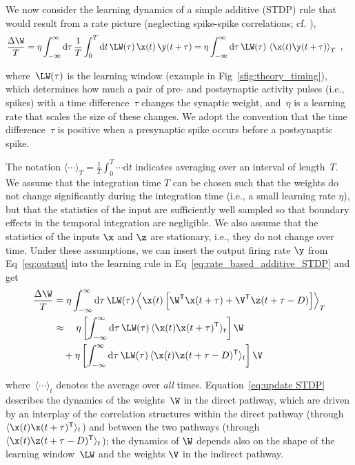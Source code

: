 We now consider the learning dynamics of a simple additive  (STDP) rule that would result from a rate picture (neglecting spike-spike correlations; cf. \cite{Kempter1999}),
\begin{align}
\frac{\Delta \W}{T} & =
\eta \int_{-\infty}^{\infty} \mathrm{d} \tau \, \frac{1}{T} \int_0^T \mathrm{d}t \, \LW(\tau)\, \x(t) \,\y(t+\tau)
= \eta \int_{-\infty}^{\infty} \mathrm{d} \tau \, \LW(\tau) \, \left\langle \x(t) \y(t+\tau) \right\rangle_T \ ,
\label{eq:rate_based_additive_STDP}
\end{align}

\noindent
where~$\LW(\tau)$ is the learning window (example in Fig~\ref{sfig:theory_timing}), which determines how much a pair of pre- and postsynaptic activity pulses (i.e., spikes) with a time difference~$\tau$ changes the synaptic weight, and~$\eta$ is a learning rate that scales the size of these changes. We adopt the convention that the time difference~$\tau$ is positive when a presynaptic spike occurs before a postsynaptic spike.

The notation $\langle\dotsi \rangle_T = \frac{1}{T} \int_0^T \dotsi \mathrm{d}t$ indicates averaging over an interval of length~$T$. We assume that the integration time $T$ can be chosen such that the weights do not change significantly during the integration time (i.e., a small learning rate $\eta$), but that the statistics of the input are sufficiently well sampled so that boundary effects in the temporal integration are negligible. We also assume that the statistics of the inputs $\x$ and $\z$ are stationary, i.e., they do not change over time. Under these assumptions, we can insert the output firing rate $\y$ from Eq~\eqref{eq:output} into the learning rule in Eq~\eqref{eq:rate_based_additive_STDP} and get
\begin{align}
\frac{\Delta \W}{T}
 &
= \eta \int_{-\infty}^{\infty} \mathrm{d} \tau\, \LW(\tau) \left\langle \x(t) \left[ \W^\mathsf{T} \x(t+\tau) + \V^\mathsf{T} \z(t+\tau-D) \right]\right\rangle_T  \label{eq:update STDP}
\\ &
\approx \quad
\eta \left[ \int_{-\infty}^{\infty} \mathrm{d} \tau\, \LW(\tau)\, \langle  \x(t) \x(t+\tau)^\mathsf{T} \rangle_t \right] \W \nonumber
\\ &
\quad
+ \eta \left[ \int_{-\infty}^{\infty} \mathrm{d} \tau\, \LW(\tau) \, \langle  \x(t) \z(t+\tau-D)^\mathsf{T} \rangle_t \right] \V  \nonumber
\end{align}

\noindent
where~$\langle \dotsi \rangle_t$ denotes the average over \emph{all} times. Equation~\eqref{eq:update STDP} describes the dynamics of the weights~$\W$ in the direct pathway, which are driven by an interplay of the correlation structures within  the direct pathway (through $\langle  \x(t) \x(t+\tau)^\mathsf{T} \rangle_t$) and between the two pathways (through $\langle  \x(t) \z(t+\tau-D)^\mathsf{T} \rangle_t$); the dynamics of $\W$ depends also on the shape of the learning window~$\LW$ and the weights $\V$ in the indirect pathway.

